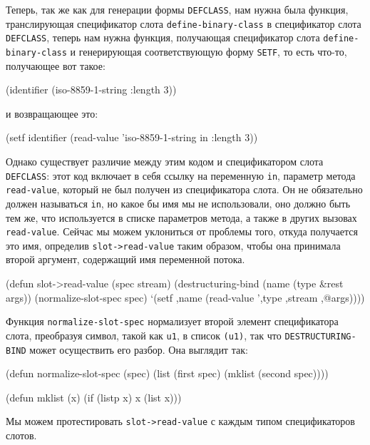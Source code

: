 Теперь, так же как для генерации формы \lstinline{DEFCLASS}, нам нужна была функция,
транслирующая спецификатор слота \lstinline{define-binary-class} в спецификатор слота
\lstinline{DEFCLASS}, теперь нам нужна функция, получающая спецификатор слота
\lstinline{define-binary-class} и генерирующая соответствующую форму \lstinline{SETF}, то есть
что-то, получающее вот такое:

\begin{myverb}
(identifier (iso-8859-1-string :length 3))
\end{myverb}

\noindent{}и возвращающее это:

\begin{myverb}
(setf identifier (read-value 'iso-8859-1-string in :length 3))
\end{myverb}

Однако существует различие между этим кодом и спецификатором слота \lstinline{DEFCLASS}:
этот код включает в себя ссылку на переменную \lstinline{in}, параметр метода
\lstinline{read-value}, который не был получен из спецификатора слота. Он не обязательно должен
называться \lstinline{in}, но какое бы имя мы не использовали, оно должно быть тем же, что
используется в списке параметров метода, а также в других вызовах
\lstinline{read-value}. Сейчас мы можем уклониться от проблемы того, откуда получается это имя,
определив \lstinline{slot->read-value} таким образом, чтобы она принимала второй аргумент,
содержащий имя переменной потока.

\begin{myverb}
(defun slot->read-value (spec stream)
  (destructuring-bind (name (type &rest args)) (normalize-slot-spec spec)
    `(setf ,name (read-value ',type ,stream ,@args))))
\end{myverb}

Функция \lstinline{normalize-slot-spec} нормализует второй элемент спецификатора слота, преобразуя символ, такой как \lstinline{u1}, в список \lstinline{(u1)}, так что \lstinline{DESTRUCTURING-BIND} может осуществить его разбор. Она выглядит так:

\begin{myverb}
(defun normalize-slot-spec (spec)
  (list (first spec) (mklist (second spec))))

(defun mklist (x) (if (listp x) x (list x)))
\end{myverb}

Мы можем протестировать \lstinline{slot->read-value} с каждым типом спецификаторов слотов.

